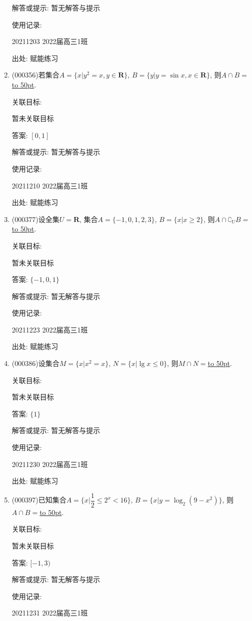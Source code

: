 \documentclass[10pt,a4paper]{article}
\newcommand{\blank}[1]{\underline{\hbox to #1pt{}}}
\begin{document}
\begin{enumerate}[1.]
解答或提示: 暂无解答与提示

使用记录:

20211203	2022届高三1班	


出处: 赋能练习
\item { (000356)}若集合$A=\{x|y^2=x,y\in \mathbf{R}\}$, $B=\{y|y=\sin x,x\in \mathbf{R}\}$, 则$A\cap B=$\blank{50}.


关联目标:

暂未关联目标

答案: $[0,1]$

解答或提示: 暂无解答与提示

使用记录:

20211210	2022届高三1班	


出处: 赋能练习
\item { (000377)}设全集$U=\mathbf{R}$, 集合$A=\{-1,0,1,2,3\}$, $B=\{x|x\ge 2\}$, 则$A\cap {\complement_U}B=$\blank{50}.


关联目标:

暂未关联目标

答案: $\{-1,0,1\}$

解答或提示: 暂无解答与提示

使用记录:

20211223	2022届高三1班	


出处: 赋能练习
\item { (000386)}设集合$M=\{x|x^2=x\}$, $N=\{x|\lg x\le 0\}$, 则$M\cap N=$\blank{50}.


关联目标:

暂未关联目标

答案: $\{1\}$

解答或提示: 暂无解答与提示

使用记录:

20211230	2022届高三1班	


出处: 赋能练习
\item { (000397)}已知集合$A=\{x|\dfrac12\le {2^x}<16\}$, $B=\{x|y=\log _2(9-x^2)\}$, 则$A\cap B=$\blank{50}.


关联目标:

暂未关联目标

答案: $[-1,3)$

解答或提示: 暂无解答与提示

使用记录:

20211231	2022届高三1班	



\end{enumerate}
\end{document}
